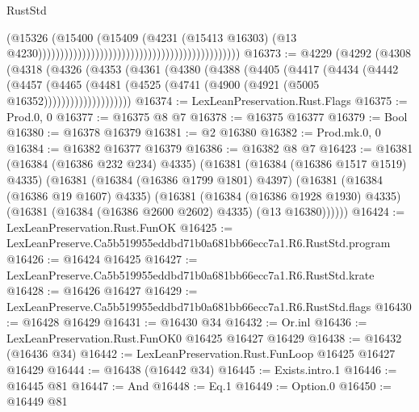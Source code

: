 \begin{lexlean}{RustStd}
\begin{coremodule}
                                                                                      (@15326
                                                                                        (@15400
                                                                                          (@15409
                                                                                            (@4231
                                                                                              (@15413
                                                                                                @16303)
                                                                                              (@13
                                                                                                @4230))))))))))))))))))))))))))))))))))))))))))))))
@16373 := @4229
    (@4292
      (@4308
        (@4318
          (@4326
            (@4353
              (@4361
                (@4380
                  (@4388
                    (@4405
                      (@4417
                        (@4434
                          (@4442
                            (@4457
                              (@4465
                                (@4481 (@4525 (@4741 (@4900 (@4921 (@5005 @16352))))))))))))))))))))
@16374 := LexLeanPreservation.Rust.Flags
@16375 := Prod.{0, 0}
@16377 := @16375 @8 @7
@16378 := @16375 @16377
@16379 := Bool
@16380 := @16378 @16379
@16381 := @2 @16380
@16382 := Prod.mk.{0, 0}
@16384 := @16382 @16377 @16379
@16386 := @16382 @8 @7
@16423 := @16381
    (@16384 (@16386 @232 @234) @4335)
    (@16381
      (@16384 (@16386 @1517 @1519) @4335)
      (@16381
        (@16384 (@16386 @1799 @1801) @4397)
        (@16381
          (@16384 (@16386 @19 @1607) @4335)
          (@16381
            (@16384 (@16386 @1928 @1930) @4335)
            (@16381 (@16384 (@16386 @2600 @2602) @4335) (@13 @16380))))))
@16424 := LexLeanPreservation.Rust.FunOK
@16425 := LexLeanPreserve.Ca5b519955eddbd71b0a681bb66ecc7a1.R6.RustStd.program
@16426 := @16424 @16425
@16427 := LexLeanPreserve.Ca5b519955eddbd71b0a681bb66ecc7a1.R6.RustStd.krate
@16428 := @16426 @16427
@16429 := LexLeanPreserve.Ca5b519955eddbd71b0a681bb66ecc7a1.R6.RustStd.flags
@16430 := @16428 @16429
@16431 := @16430 @34
@16432 := Or.inl
@16436 := LexLeanPreservation.Rust.FunOK0 @16425 @16427 @16429
@16438 := @16432 (@16436 @34)
@16442 := LexLeanPreservation.Rust.FunLoop @16425 @16427 @16429
@16444 := @16438 (@16442 @34)
@16445 := Exists.intro.{1}
@16446 := @16445 @81
@16447 := And
@16448 := Eq.{1}
@16449 := Option.{0}
@16450 := @16449 @81

\end{coremodule}
\end{lexlean}
